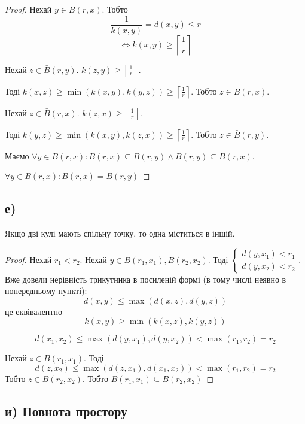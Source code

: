 \documentclass[11pt, a4paper]{article} %
\begin{document}
\begin{proof}
    Нехай $y \in \bar B(r,x)$. Тобто 
    $$\frac{1}{k(x,y)} = d(x,y) \le r $$
    $$\iff k(x,y) \ge \left\lceil \frac{1}{r} \right\rceil $$
    
    Нехай $z \in \bar B(r,y)$. $k(z,y) \ge \left\lceil \frac{1}{r} \right\rceil$.

    Тоді $k(x,z) \ge \min(k(x,y), k(y,z)) \ge \left\lceil \frac{1}{r} \right\rceil$. Тобто $z \in \bar B(r,x)$.

    Нехай $z \in \bar B(r,x)$. $k(z,x) \ge \left\lceil \frac{1}{r} \right\rceil$.

    Тоді $k(y,z) \ge \min(k(x,y), k(z,x)) \ge \left\lceil \frac{1}{r} \right\rceil$. Тобто $z \in \bar B(r,y)$.

    Маємо $\forall y \in \bar B(r,x): \bar B(r,x) \subseteq \bar B(r,y) \wedge \bar B(r,y) \subseteq \bar B(r,x)$.

    $\forall y \in \bar B(r,x): \bar B(r,x) = \bar B(r,y)$
    
\end{proof}

\subsection*{е)}
\begin{mdframed}
    Якщо дві кулі мають спільну точку, то одна міститься в іншій.
\end{mdframed}

\begin{proof}
    Нехай $r_1 < r_2$. Нехай $y \in B(r_1,x_1), B(r_2, x_2)$. 
    Тоді $\begin{cases}
        d(y,x_1) < r_1 \\
        d(y,x_2) < r_2
    \end{cases}$. 
    Вже довели нерівність трикутника в посиленій формі (в тому числі неявно в попередньому пункті):
    $$d(x,y) \le \max(d(x,z), d(y,z))$$
    це еквівалентно
    $$k(x,y) \ge \min(k(x,z), k(y,z))$$
    
    $$d(x_1, x_2) \le \max(d(y,x_1), d(y,x_2)) < \max(r_1, r_2) = r_2$$

    Нехай $z \in B(r_1, x_1)$. Тоді
    $$d(z, x_2) \le \max(d(z,x_1), d(x_1,x_2)) < \max(r_1, r_2) = r_2$$
    Тобто $z \in B(r_2, x_2)$.
    Тобто $B(r_1, x_1) \subseteq B(r_2, x_2)$
\end{proof}

\subsection*{и) Повнота простору}
\end{document}

